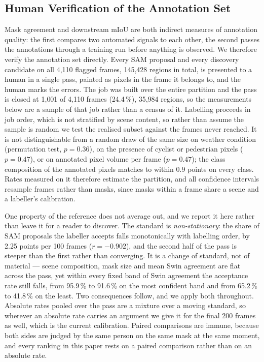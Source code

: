 \documentclass[conference]{IEEEtran}
\newcommand{\humancoverage}{1{,}001 of 4{,}110 frames (24.4\,\%), 35{,}984 regions}
\begin{document}
\subsection{Human Verification of the Annotation Set}
\label{sec:human_verification}
Mask agreement and downstream mIoU are both indirect measures of annotation quality: the first compares
two automated signals to each other, the second passes the annotations through a training run before
anything is observed. We therefore verify the annotation set directly. Every SAM proposal and every
discovery candidate on all 4{,}110 flagged frames, 145{,}428 regions in total, is presented to a human in
a single pass, painted as pixels in the frame it belongs to, and the human marks the errors.
The job was built over the entire partition and the pass is closed at \humancoverage, so the
measurements below are a sample of that job rather than a census of it.
Labelling proceeds in job order, which is not stratified by scene content, so rather than assume the
sample is random we test the realised subset against the frames never reached. It is not
distinguishable from a random draw of the same size on weather condition (permutation test,
$p{=}0.36$), on the presence of cyclist or pedestrian pixels ($p{=}0.47$), or on
annotated pixel volume per frame ($p{=}0.47$); the class composition of the annotated pixels
matches to within $0.9$ points on every class. Rates measured on it therefore estimate the
partition, and all confidence intervals resample frames rather than masks, since masks within a frame
share a scene and a labeller's calibration.

One property of the reference does not average out, and we report it here rather than leave it for a
reader to discover. The standard is \emph{non-stationary}: the share of SAM proposals the labeller
accepts falls monotonically with labelling order, by 2.25 points per 100 frames ($r{=}-0.902$), and the
second half of the pass is steeper than the first rather than converging.
It is a change of standard, not of material --- scene composition, mask size and mean Swin agreement are
flat across the pass, yet within every fixed band of Swin agreement the acceptance rate still falls,
from 95.9\,\% to 91.6\,\% on the most confident band and from 65.2\,\% to 41.8\,\% on the least.
Two consequences follow, and we apply both throughout. Absolute rates pooled over the pass are a
mixture over a moving standard, so wherever an absolute rate carries an argument we give it for the
final 200 frames as well, which is the current calibration. Paired comparisons are immune, because
both sides are judged by the same person on the same mask at the same moment, and every ranking in
this paper rests on a paired comparison rather than on an absolute rate.
\end{document}

